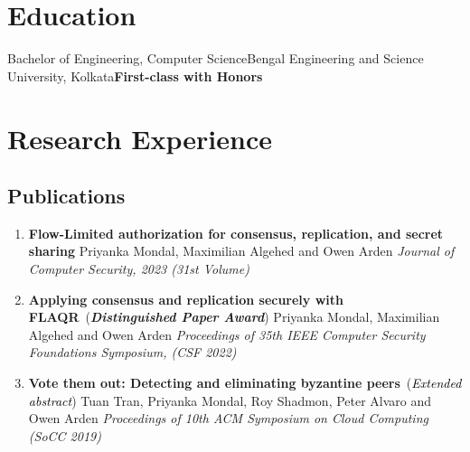 \documentclass[9pt,a4paper]{moderncv}
\begin{document}
\makecvtitle
\vspace{-1cm}
\section{Education}
\vspace{0.2cm}
{Bachelor of Engineering, Computer Science}{Bengal Engineering and Science University, Kolkata}{}{\textbf{First-class with Honors}}{}
\section{Research Experience}
\vspace{0.1cm}
\hspace{-0.1cm}
\hspace{-0.1cm}
\subsection{Publications}
\begin{enumerate}
\item{\textbf{Flow-Limited authorization for consensus, replication, and secret sharing}}
\newline Priyanka Mondal, Maximilian Algehed and Owen Arden \newline
\textit{Journal of Computer Security, 2023 (31st Volume)~~}
\item{\textbf{Applying consensus and replication securely with FLAQR}}~({\textbf{\textsf{\textcolor{bittersweet}{\textit{Distinguished Paper Award}}}}})
\newline Priyanka Mondal, Maximilian Algehed and Owen Arden \newline
\textit{Proceedings of 35th IEEE Computer Security Foundations Symposium, (CSF 2022)~~}
\item{\textbf{Vote them out: Detecting and eliminating byzantine peers}}~({\textit{\textsf{\textcolor{black}{Extended abstract}}}})
\newline Tuan Tran, Priyanka Mondal, Roy Shadmon, Peter Alvaro and Owen Arden \newline
\textit{Proceedings of 10th ACM Symposium on Cloud Computing (SoCC 2019)~~}
\end{enumerate}
\end{document}

